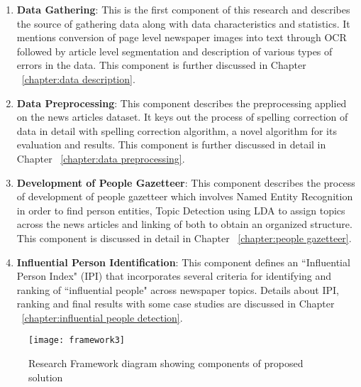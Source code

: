 \begin{enumerate}
\item \textbf {Data Gathering}:  
This is the first component of this research and describes the source of gathering data along with data characteristics and statistics. It mentions conversion of page level newspaper images into text through OCR followed by article level segmentation and description of various types of errors in the data. This component is further discussed in Chapter ~\ref{chapter:data description}.

\item \textbf {Data Preprocessing}:
This component describes the preprocessing applied on the news articles dataset. It keys out the process of spelling correction of data in detail with spelling correction algorithm, a novel algorithm for its evaluation and results. This component is further discussed in detail in Chapter ~\ref{chapter:data preprocessing}.

\item \textbf {Development of People Gazetteer}:
This component describes the process of development of people gazetteer which involves Named Entity Recognition in order to find person entities, Topic Detection using LDA to assign topics across the news articles and linking of both to obtain an organized structure. This component is discussed in detail in Chapter ~\ref{chapter:people gazetteer}.

\item \textbf {Influential Person Identification}:
This component defines an ``Influential Person Index" (IPI) that incorporates several criteria for identifying and ranking of ``influential people" across newspaper topics. Details about IPI, ranking and final results with some case studies are discussed in Chapter ~\ref{chapter:influential people detection}.

\end{enumerate}
 
\begin{figure}[h]
\texttt{[image: framework3]}
\caption{Research Framework diagram showing components of proposed solution}
\end{figure} 